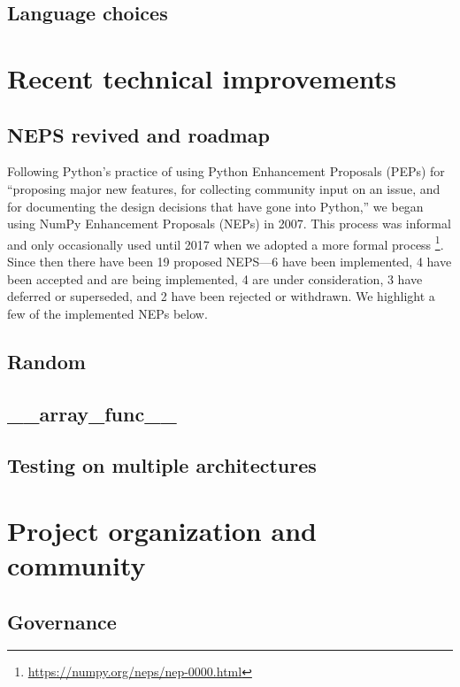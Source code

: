 \documentclass[fleqn,10pt]{wlscirep}
\begin{document}
\subsection*{Language choices}

\section*{Recent technical improvements}

\subsection*{NEPS revived and roadmap}

Following Python's practice of using Python Enhancement Proposals (PEPs) for
``proposing major new features, for collecting community input on an
issue, and for documenting the design decisions that have gone into Python,''
we began using NumPy Enhancement Proposals (NEPs) in 2007.
This process was informal and only occasionally used until 2017 when
we adopted a more formal process \footnote{\url{https://numpy.org/neps/nep-0000.html}}.
Since then there have been 19 proposed NEPS---6 have been implemented,
4 have been accepted and are being implemented, 4 are under consideration,
3 have deferred or superseded, and 2 have been rejected or withdrawn.
We highlight a few of the implemented NEPs below.

\subsection*{Random}

\subsection*{\_\_array\_func\_\_}

\subsection*{Testing on multiple architectures}

\section*{Project organization and community}

\subsection*{Governance}
\end{document}
